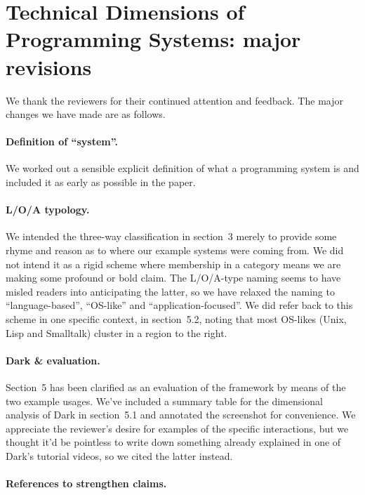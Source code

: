 \section*{Technical Dimensions of Programming Systems: major revisions}

We thank the reviewers for their continued attention and feedback. The
major changes we have made are as follows.

\paragraph{Definition of ``system''.}

We worked out a sensible explicit definition of what a programming
system is and included it as early as possible in the paper.

\paragraph{L/O/A typology.}

We intended the three-way classification in section~3 merely to provide
some rhyme and reason as to where our example systems were coming from.
We did not intend it as a rigid scheme where membership in a category
means we are making some profound or bold claim. The L/O/A-type naming
seems to have misled readers into anticipating the latter, so we have
relaxed the naming to ``language-based'', ``OS-like'' and
``application-focused''. We did refer back to this scheme in one
specific context, in section~5.2, noting that most OS-likes (Unix, Lisp
and Smalltalk) cluster in a region to the right.

\paragraph{Dark \& evaluation.}

Section~5 has been clarified as an evaluation of the framework by means
of the two example usages. We've included a summary table for the
dimensional analysis of Dark in section~5.1 and annotated the screenshot
for convenience. We appreciate the reviewer's desire for examples of the
specific interactions, but we thought it'd be pointless to write down
something already explained in one of Dark's tutorial videos, so we
cited the latter instead.

\paragraph{References to strengthen claims.}

